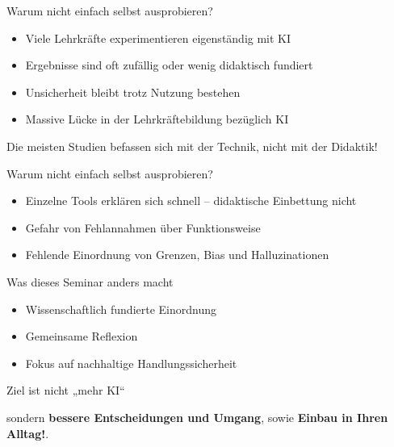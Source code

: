 \documentclass[14pt, aspectratio=169]{beamer}
\begin{document}
\begin{frame}{Warum nicht einfach selbst ausprobieren?}
\begin{itemize}
    \item Viele Lehrkräfte experimentieren eigenständig mit KI
    \item Ergebnisse sind oft zufällig oder wenig didaktisch fundiert
    \item Unsicherheit bleibt trotz Nutzung bestehen
    \item Massive Lücke in der Lehrkräftebildung bezüglich KI
\end{itemize}
\begin{center}
    Die meisten Studien befassen sich mit der Technik, nicht mit der Didaktik!
    \begin{tiny}
        \autocite{deriba_fairness_2025}
    \end{tiny}
\end{center}
\end{frame}

\begin{frame}{Warum nicht einfach selbst ausprobieren?}
\begin{itemize}
    \item Einzelne Tools erklären sich schnell – didaktische Einbettung nicht
    \item Gefahr von Fehlannahmen über Funktionsweise
    \item Fehlende Einordnung von Grenzen, Bias und Halluzinationen
\end{itemize}
\end{frame}

\begin{frame}{Was dieses Seminar anders macht}
\begin{itemize}
    \item Wissenschaftlich fundierte Einordnung
    \item Gemeinsame Reflexion
    \item Fokus auf nachhaltige Handlungssicherheit
\end{itemize}
\end{frame}

\begin{frame}{}
\begin{center}
    \Large Ziel ist nicht „mehr KI“
    
    \vspace{0.3cm}
    \Large sondern \textbf{bessere Entscheidungen und Umgang}, sowie \textbf{Einbau in Ihren Alltag!}.
\end{center}
\end{frame}
\end{document}
